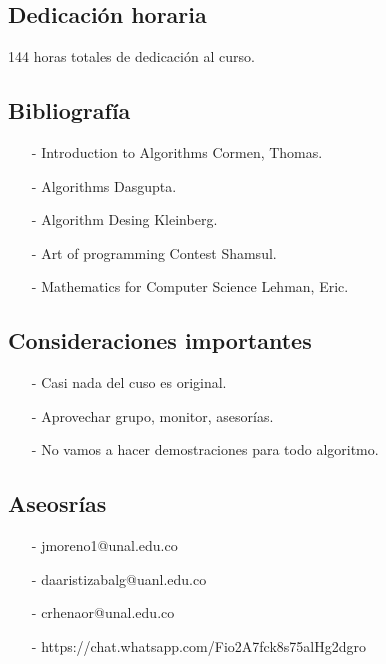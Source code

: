 \documentclass{article}
\theoremstyle{definition}
\begin{document}
\begin{flushleft}
\begin{itemize}
\end{itemize}

\subsection{Dedicación horaria}

144 horas totales de dedicación al curso.

\subsection{Bibliografía}

\begin{itemize}

  \item[-] Introduction to Algorithms Cormen, Thomas.
  \item[-] Algorithms Dasgupta.
  \item[-] Algorithm Desing Kleinberg.
  \item[-] Art of programming Contest Shamsul.
  \item[-] Mathematics for Computer Science Lehman, Eric.

\end{itemize}

\subsection{Consideraciones importantes}

\begin{itemize}

  \item[-] Casi nada del cuso es original.
  \item[-] Aprovechar grupo, monitor, asesorías.
  \item[-] No vamos a hacer demostraciones para todo algoritmo.

\end{itemize}

\subsection{Aseosrías}

\begin{itemize}

  \item[-] jmoreno1@unal.edu.co
  \item[-] daaristizabalg@uanl.edu.co
  \item[-] crhenaor@unal.edu.co
  \item[-] https://chat.whatsapp.com/Fio2A7fck8s75alHg2dgro


\end{itemize}
\end{flushleft}
\end{document}
